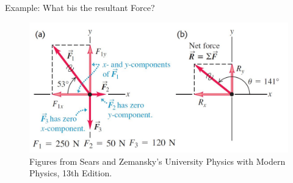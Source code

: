 \documentclass[]{beamer}
\begin{document}
\begin{frame}

  Example: What bis the resultant Force?
    
       
  \begin{figure}[h!]  
   \includegraphics[width=1.\textwidth]{images/f8.jpg}
   \caption{ {\tiny Figures from Sears and Zemansky's University Physics 
   with Modern Physics, 13th Edition.} }
 \end{figure}
 
 \end{frame}
   
\end{document}
